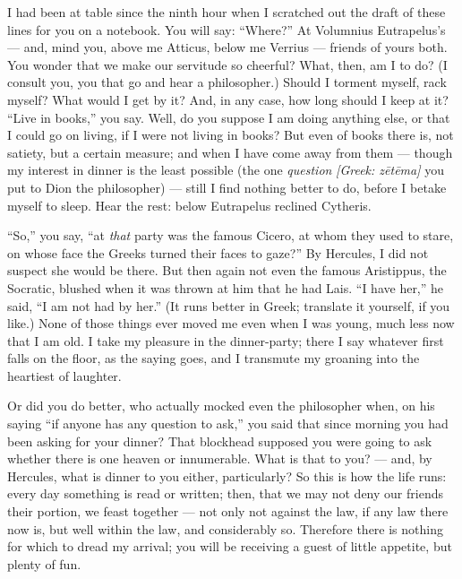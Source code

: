 

 I had been at table since the ninth hour when I scratched out the draft of these lines for you on a notebook. You will say: ``Where?'' At Volumnius Eutrapelus's --- and, mind you, above me Atticus, below me Verrius --- friends of yours both. You wonder that we make our servitude so cheerful? What, then, am I to do? (I consult you, you that go and hear a philosopher.) Should I torment myself, rack myself? What would I get by it? And, in any case, how long should I keep at it? ``Live in books,'' you say. Well, do you suppose I am doing anything else, or that I could go on living, if I were not living in books? But even of books there is, not satiety, but a certain measure; and when I have come away from them --- though my interest in dinner is the least possible (the one \textit{question} \textit{[Greek: z\=et\=ema]} you put to Dion the philosopher) --- still I find nothing better to do, before I betake myself to sleep. Hear the rest: below Eutrapelus reclined Cytheris.

 ``So,'' you say, ``at \emph{that} party was the famous Cicero, at whom they used to stare, on whose face the Greeks turned their faces to gaze?'' By Hercules, I did not suspect she would be there. But then again not even the famous Aristippus, the Socratic, blushed when it was thrown at him that he had Lais. ``I have her,'' he said, ``I am not had by her.'' (It runs better in Greek; translate it yourself, if you like.) None of those things ever moved me even when I was young, much less now that I am old. I take my pleasure in the dinner-party; there I say whatever first falls on the floor, as the saying goes, and I transmute my groaning into the heartiest of laughter.

 Or did you do better, who actually mocked even the philosopher when, on his saying ``if anyone has any question to ask,'' you said that since morning you had been asking for your dinner? That blockhead supposed you were going to ask whether there is one heaven or innumerable. What is that to you? --- and, by Hercules, what is dinner to you either, particularly? So this is how the life runs: every day something is read or written; then, that we may not deny our friends their portion, we feast together --- not only not against the law, if any law there now is, but well within the law, and considerably so. Therefore there is nothing for which to dread my arrival; you will be receiving a guest of little appetite, but plenty of fun.
